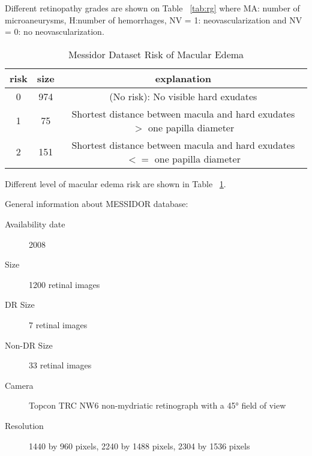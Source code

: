 Different retinopathy grades are shown on Table ~\ref{tab:rg} where MA: number of microaneurysms, H:number of hemorrhages, NV = 1: neovascularization and NV = 0: no neovascularization. 

\begin{table}[t]
\centering
\caption{Messidor Dataset Risk of Macular Edema} \label{tab:ma}
\begin{tabular}{|c|c|c|} \hline
risk & size &  explanation \\ \hline
0 & 974 & (No risk): No visible hard exudates \\ \hline
1 & 75 & Shortest distance between macula and hard exudates $>$ one papilla diameter \\\hline
2 & 151 & Shortest distance between macula and hard exudates $<=$ one papilla diameter \\\hline
\end{tabular}
\end{table}

Different level of macular edema risk are shown in Table ~\ref{tab:ma}.


General information about MESSIDOR database:

\begin{description}
    \item[Availability date] 2008
    \item[Size] 1200 retinal images
    \item[DR Size] 7 retinal images
    \item[Non-DR Size] 33 retinal images
    \item[Camera]  Topcon TRC NW6 non-mydriatic retinograph with a 45° field of view
    \item[Resolution] 1440 by 960 pixels, 2240 by 1488 pixels, 2304 by 1536 pixels
\end{description}


